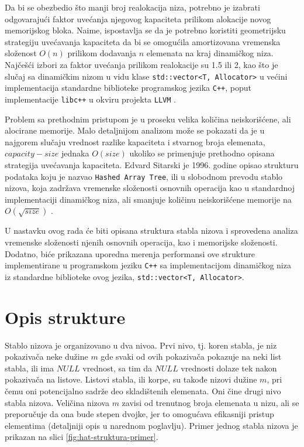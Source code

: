 \documentclass[a4paper]{article}
\begin{document}
Da bi se obezbedio što manji broj realokacija niza, potrebno je izabrati odgovarajući faktor uvećanja njegovog kapaciteta prilikom alokacije novog memorijskog bloka. Naime, ispostavlja se da je potrebno koristiti geometrijsku strategiju uvećavanja kapaciteta da bi se omogućila amortizovana vremenska složenost $O(n)$ prilikom dodavanja $n$ elemenata na kraj dinamičkog niza. Najčešći izbori za faktor uvećanja prilikom realokacije su 1.5 ili 2, kao što je slučaj sa dinamičkim nizom u vidu klase \verb|std::vector<T, Allocator>| u većini implementacija standardne biblioteke programskog jezika \verb|C++|, poput implementacije \verb|libc++| u okviru projekta \verb|LLVM| \cite{libcxx-vector-growth}.

Problem sa prethodnim pristupom je u proseku velika količina neiskorišćene, ali alocirane memorije. Malo detaljnijom analizom može se pokazati da je u najgorem slučaju vrednost razlike kapaciteta i stvarnog broja elemenata, $capacity - size$ jednaka $O(size)$ ukoliko se primenjuje prethodno opisana strategija uvećavanja kapaciteta. Edvard Sitarski je 1996. godine opisao strukturu podataka koju je nazvao \verb|Hashed Array Tree|, ili u slobodnom prevodu stablo nizova, koja zadržava vremenske složenosti osnovnih operacija kao u standardnoj implementaciji dinamičkog niza, ali smanjuje količinu neiskorišćene memorije na $O(\sqrt{size})$ \cite{hat-sitarski}.

U nastavku ovog rada će biti opisana struktura stabla nizova i sprovedena analiza vremenske složenosti njenih osnovnih operacija, kao i memorijske složenosti. Dodatno, biće prikazana uporedna merenja performansi ove strukture implementirane u programskom jeziku \verb|C++| sa implementacijom dinamičkog niza iz standardne biblioteke ovog jezika, \verb|std::vector<T, Allocator>|.

\section{Opis strukture}

Stablo nizova je organizovano u dva nivoa. Prvi nivo, tj. koren stabla, je niz pokazivača neke dužine $m$ gde svaki od ovih pokazivača pokazuje na neki list stabla, ili ima $NULL$ vrednost, sa tim da $NULL$ vrednosti dolaze tek nakon pokazivača na listove. Listovi stabla, ili korpe, su takođe nizovi dužine $m$, pri čemu oni potencijalno sadrže deo skladištenih elemenata. Oni čine drugi nivo stabla nizova. Veličina nizova $m$ zavisi od trenutnog broja elemenata u nizu, ali se preporučuje da ona bude stepen dvojke, jer to omogućava efikasniji pristup elementima (detaljniji opis u narednom poglavlju). Primer jednog stabla nizova je prikazan na slici \ref{fig:hat-struktura-primer}.
\end{document}
